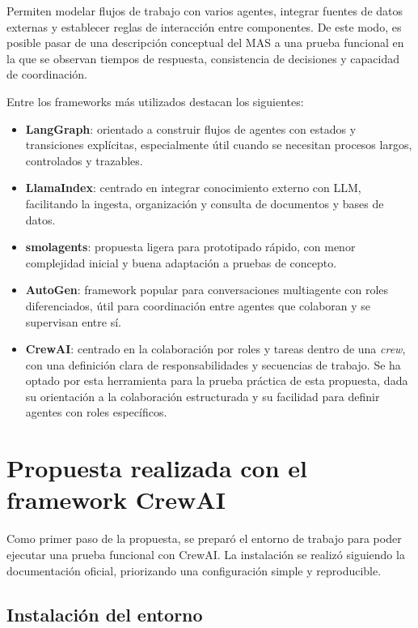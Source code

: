 \documentclass[12pt,a4paper]{article}
\begin{document}
Permiten modelar flujos de trabajo con varios agentes, integrar fuentes de datos externas y establecer reglas de interacción entre componentes. De este modo, es posible pasar de una descripción conceptual del MAS a una prueba funcional en la que se observan tiempos de respuesta, consistencia de decisiones y capacidad de coordinación.

Entre los frameworks más utilizados destacan los siguientes:

\begin{itemize}
    \item \textbf{LangGraph}: orientado a construir flujos de agentes con estados y transiciones explícitas, especialmente útil cuando se necesitan procesos largos, controlados y trazables.
    \item \textbf{LlamaIndex}: centrado en integrar conocimiento externo con LLM, facilitando la ingesta, organización y consulta de documentos y bases de datos.
    \item \textbf{smolagents}: propuesta ligera para prototipado rápido, con menor complejidad inicial y buena adaptación a pruebas de concepto.
    \item \textbf{AutoGen}: framework popular para conversaciones multiagente con roles diferenciados, útil para coordinación entre agentes que colaboran y se supervisan entre sí.
    \item \textbf{CrewAI}: centrado en la colaboración por roles y tareas dentro de una \textit{crew}, con una definición clara de responsabilidades y secuencias de trabajo. Se ha optado por esta herramienta para la prueba práctica de esta propuesta, dada su orientación a la colaboración estructurada y su facilidad para definir agentes con roles específicos.
\end{itemize}

\section{Propuesta realizada con el framework CrewAI}

Como primer paso de la propuesta, se preparó el entorno de trabajo para poder ejecutar una prueba funcional con CrewAI. La instalación se realizó siguiendo la documentación oficial, priorizando una configuración simple y reproducible.

\subsection{Instalación del entorno}
\end{document}
